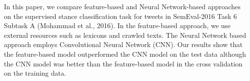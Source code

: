 In this paper, we compare feature-based and Neural Network-based approaches on the supervised stance classification task for tweets in SemEval-2016 Task 6 Subtask A (Mohammad et al., 2016). In the feature-based approach, we use external resources such as lexicons and crawled texts. The Neural Network based approach employs Convolutional Neural Network (CNN). Our results show that the feature-based model outperformed the CNN model on the test data although the CNN model was better than the feature-based model in the cross validation on the training data.
